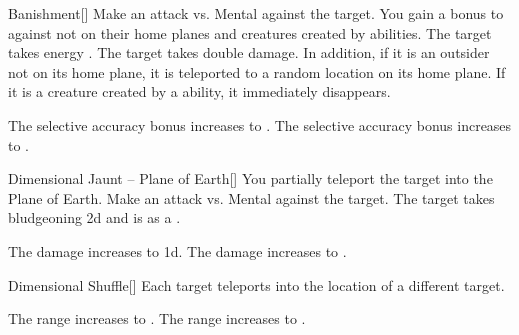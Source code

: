 \lowercase{\hypertarget{spell:Banishment}{}}\label{spell:Banishment}
\begin{freeability}[Rank 3]{\hypertarget{spell:Banishment}{Banishment}}[]
Make an attack vs. Mental against the target.
You gain a  bonus to  against  not on their home planes and creatures created by  abilities.
\hit The target takes energy .
\crit The target takes double damage.
In addition, if it is an outsider not on its home plane, it is teleported to a random location on its home plane.
If it is a creature created by a  ability, it immediately disappears.

\rankline
{} The selective accuracy bonus increases to .
 The selective accuracy bonus increases to .
\end{freeability}
\vspace{0.25em}



\lowercase{\hypertarget{spell:Dimensional Jaunt -- Plane of Earth}{}}\label{spell:Dimensional Jaunt -- Plane of Earth}
\begin{freeability}[Rank 3]{\hypertarget{spell:Dimensional Jaunt -- Plane of Earth}{Dimensional Jaunt -- Plane of Earth}}[]
You partially teleport the target into the Plane of Earth.
Make an attack vs. Mental against the target.
\hit The target takes bludgeoning  \minus2d and is  as a .

\rankline
{} The damage increases to  \minus1d.
 The damage increases to .
\end{freeability}
\vspace{0.25em}



\lowercase{\hypertarget{spell:Dimensional Shuffle}{}}\label{spell:Dimensional Shuffle}
\begin{freeability}[Rank 3]{\hypertarget{spell:Dimensional Shuffle}{Dimensional Shuffle}}[]
Each target teleports into the location of a different target.

\rankline
{} The range increases to \rnglong.
 The range increases to \rngext.
\end{freeability}
\vspace{0.25em}



